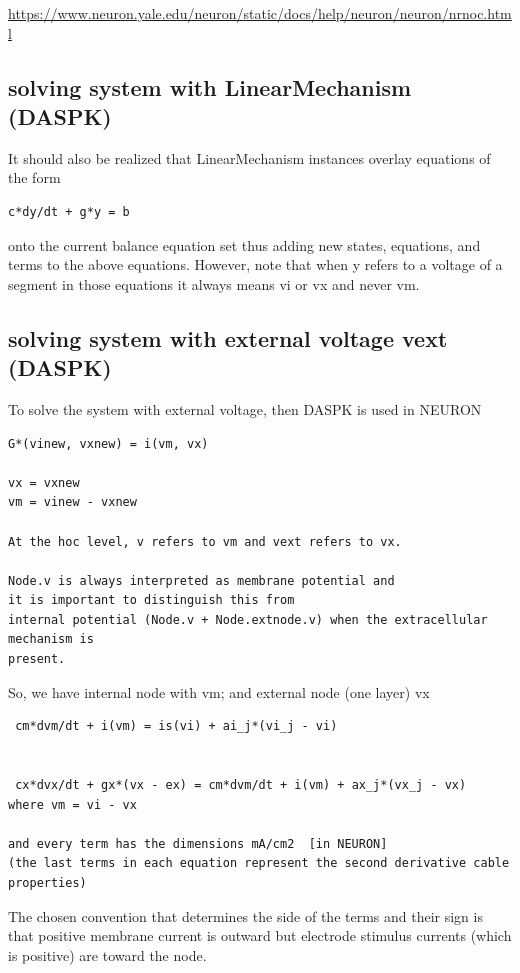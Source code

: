 \url{https://www.neuron.yale.edu/neuron/static/docs/help/neuron/neuron/nrnoc.html}


\subsection{solving system with LinearMechanism (DASPK)}

It should also be realized that LinearMechanism instances overlay equations of
the form
\begin{verbatim}
c*dy/dt + g*y = b
\end{verbatim}

onto the current balance equation set thus adding new states, equations, and
terms to the above equations. However, note that when y refers to a voltage of a
segment in those equations it always means vi or vx and never vm.



\subsection{solving system with external voltage vext (DASPK)}

To solve the system with external voltage, then DASPK is used in NEURON
\begin{verbatim}
G*(vinew, vxnew) = i(vm, vx)

vx = vxnew
vm = vinew - vxnew

At the hoc level, v refers to vm and vext refers to vx.

Node.v is always interpreted as membrane potential and 
it is important to distinguish this from 
internal potential (Node.v + Node.extnode.v) when the extracellular mechanism is
present.

\end{verbatim}

So, we have internal node with vm; and external node (one layer) vx
\begin{verbatim}
 cm*dvm/dt + i(vm) = is(vi) + ai_j*(vi_j - vi)


 cx*dvx/dt + gx*(vx - ex) = cm*dvm/dt + i(vm) + ax_j*(vx_j - vx)
where vm = vi - vx

and every term has the dimensions mA/cm2  [in NEURON]
(the last terms in each equation represent the second derivative cable
properties)

\end{verbatim}
The chosen convention that determines the side of the terms and their sign
is that positive membrane current is outward but electrode stimulus
currents (which is positive) are toward the node. 

